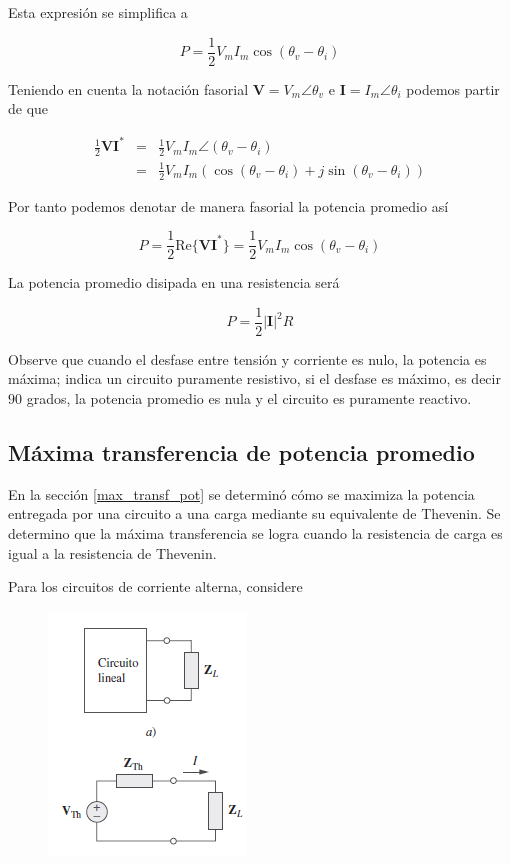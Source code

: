 Esta expresión se simplifica a 

\begin{equation*}
P = \frac{1}{2} V_m I_m \cos (\theta_v - \theta_i)
\end{equation*}

Teniendo en cuenta la notación fasorial $\mathbf{V}=V_m \angle \theta_v$ e $\mathbf{I}=I_m\angle \theta_i$ podemos partir de que

\begin{eqnarray*}
\frac{1}{2} \mathbf{V} \mathbf{I}^{*} &=& \frac{1}{2}V_m I_m \angle (\theta_v - \theta_i) \\
 &=& \frac{1}{2}V_m I_m \left( \cos (\theta_v - \theta_i) + j \sin (\theta_v - \theta_i) \right)
\end{eqnarray*}

Por tanto podemos denotar de manera fasorial la potencia promedio así

\begin{equation*}
P = \frac{1}{2} \mathrm{Re}\{ \mathbf{VI^{*}} \} =  \frac{1}{2}V_m I_m \cos (\theta_v - \theta_i)
\end{equation*}

La potencia promedio disipada en una resistencia será

\begin{equation*}
P = \frac{1}{2} |\mathbf{I}|^2 R
\end{equation*}

Observe que cuando el desfase entre tensión y corriente es nulo, la potencia es máxima; indica un circuito puramente resistivo, si el desfase es máximo, es decir $90$ grados, la potencia promedio es nula y el circuito es puramente reactivo. 

\subsection{Máxima transferencia de potencia promedio}

En la sección \ref{max_transf_pot} se determinó cómo se maximiza la potencia entregada por una circuito a una carga mediante su equivalente de Thevenin. Se determino que la máxima transferencia se logra cuando la resistencia de  carga es igual a la resistencia de Thevenin.

Para los circuitos de corriente alterna, considere 

\begin{figure}[H]
    \centering
    \includegraphics{Elect_circ/pot_f1.png}
\end{figure}

